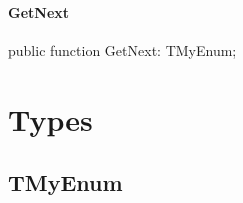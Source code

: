 \documentclass{report}
\newif\ifpdf
\begin{document}
\paragraph*{GetNext}\hspace*{\fill}

\label{ok_type_helpers.TMyEnumHelper-GetNext}
\begin{list}{}{
\setlength{\itemindent}{0cm}
\setlength{\listparindent}{0cm}
\setlength{\leftmargin}{\evensidemargin}
\addtolength{\leftmargin}{\tmplength}
\settowidth{\labelsep}{X}
\addtolength{\leftmargin}{\labelsep}
\setlength{\labelwidth}{\tmplength}
}
\item[\textbf{Declaration}\hfill]
\ifpdf
\begin{flushleft}
\fi
\begin{ttfamily}
public function GetNext: TMyEnum;\end{ttfamily}

\ifpdf
\end{flushleft}
\fi

\end{list}
\section{Types}
\ifpdf
\subsection*{\large{\textbf{TMyEnum}}\normalsize\hspace{1ex}\hrulefill}
\else
\end{document}
